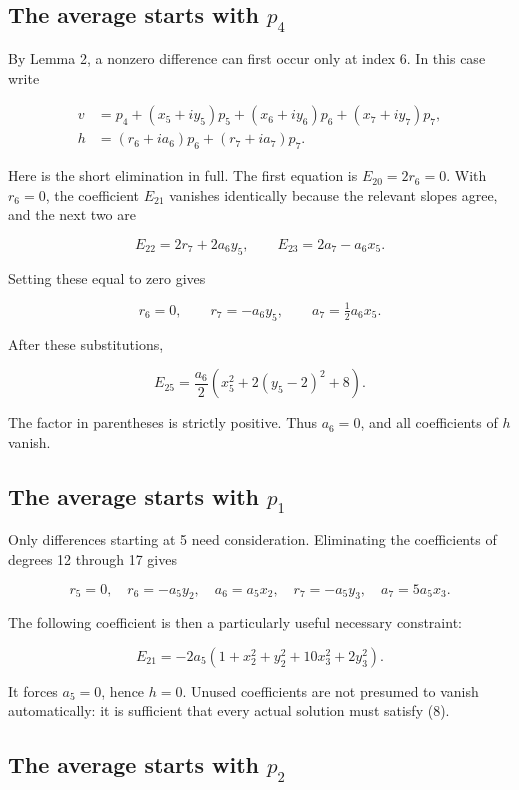 \subsection{\texorpdfstring{The average starts with
\(p_4\)}{The average starts with p\_4}}\label{the-average-starts-with-p_4}

By Lemma 2, a nonzero difference can first occur only at index 6. In
this case write

\[
\begin{aligned}
v&=p_4+(x_5+iy_5)p_5+(x_6+iy_6)p_6+(x_7+iy_7)p_7,\\
h&=(r_6+ia_6)p_6+(r_7+ia_7)p_7.
\end{aligned}
\]

Here is the short elimination in full. The first equation is
\(E_{20}=2r_6=0\). With \(r_6=0\), the coefficient \(E_{21}\) vanishes
identically because the relevant slopes agree, and the next two are

\[
E_{22}=2r_7+2a_6y_5,\qquad E_{23}=2a_7-a_6x_5.
\]

Setting these equal to zero gives

\[
r_6=0,\qquad r_7=-a_6y_5,\qquad a_7=\tfrac12a_6x_5.
\]

After these substitutions,

\[
E_{25}=\frac{a_6}{2}\left(x_5^2+2(y_5-2)^2+8\right). \tag{7}
\]

The factor in parentheses is strictly positive. Thus \(a_6=0\), and all
coefficients of \(h\) vanish.

\subsection{\texorpdfstring{The average starts with
\(p_1\)}{The average starts with p\_1}}\label{the-average-starts-with-p_1}

Only differences starting at 5 need consideration. Eliminating the
coefficients of degrees 12 through 17 gives

\[
r_5=0,\quad r_6=-a_5y_2,\quad a_6=a_5x_2,
\quad r_7=-a_5y_3,\quad a_7=5a_5x_3.
\]

The following coefficient is then a particularly useful necessary
constraint:

\[
E_{21}=-2a_5\left(1+x_2^2+y_2^2+10x_3^2+2y_3^2\right). \tag{8}
\]

It forces \(a_5=0\), hence \(h=0\). Unused coefficients are not presumed
to vanish automatically: it is sufficient that every actual solution
must satisfy (8).

\subsection{\texorpdfstring{The average starts with
\(p_2\)}{The average starts with p\_2}}\label{the-average-starts-with-p_2}

